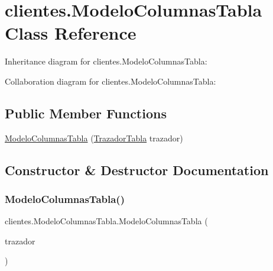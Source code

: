 \hypertarget{classclientes_1_1_modelo_columnas_tabla}{}\section{clientes.\+Modelo\+Columnas\+Tabla Class Reference}
\label{classclientes_1_1_modelo_columnas_tabla}


Inheritance diagram for clientes.\+Modelo\+Columnas\+Tabla\+:


Collaboration diagram for clientes.\+Modelo\+Columnas\+Tabla\+:
\subsection*{Public Member Functions}
\begin{DoxyCompactItemize}
\item 
\mbox{\hyperlink{classclientes_1_1_modelo_columnas_tabla_a459144165e8e786dea691bf1a3beeebb}{Modelo\+Columnas\+Tabla}} (\mbox{\hyperlink{classclientes_1_1_trazador_tabla}{Trazador\+Tabla}} trazador)
\end{DoxyCompactItemize}


\subsection{Constructor \& Destructor Documentation}
\mbox{\label{classclientes_1_1_modelo_columnas_tabla_a459144165e8e786dea691bf1a3beeebb}} 
\subsubsection{\texorpdfstring{Modelo\+Columnas\+Tabla()}{ModeloColumnasTabla()}}
{\footnotesize\ttfamily clientes.\+Modelo\+Columnas\+Tabla.\+Modelo\+Columnas\+Tabla (\begin{DoxyParamCaption}\item[{\mbox{\hyperlink{classclientes_1_1_trazador_tabla}{Trazador\+Tabla}}}]{trazador }\end{DoxyParamCaption})\hspace{0.3cm}{\ttfamily [inline]}}


